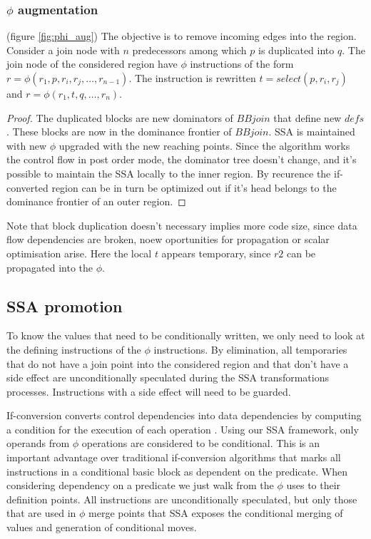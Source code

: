 \subsubsection{$\phi$ augmentation} (figure \ref{fig:phi_aug})
The objective is to remove incoming edges into the region. 
Consider a join node with $n$ predecessors among which $p$ is duplicated into $q$.  The join node of the considered region have $\phi$ instructions of the form $r=\phi(r_1,p,r_i,r_j,\dots,r_{n-1})$. The instruction is rewritten $t=select(p,r_i,r_j)$ and \mbox{$r=\phi(r_1,t,q,\dots,r_n)$}. 
\begin{proof}The duplicated blocks are new dominators of $BBjoin$ that define new $defs$. These blocks are now in the dominance frontier of $BBjoin$. SSA is maintained with new $\phi$ upgraded with the new reaching points.
Since the algorithm works the control flow in post order mode, the dominator tree doesn't change, and it's possible to maintain the SSA locally to the inner region. By recurence the if-converted region can be in turn be optimized out if it's head belongs to the dominance frontier of an outer region.
\end{proof}
Note that block duplication doesn't necessary implies more code size, since data flow dependencies are broken, noew oportunities for propagation or scalar optimisation arise. Here the local $t$ appears temporary, since $r2$ can be propagated into the $\phi$.

\subsection{SSA promotion}

To know the values that need to be conditionally written, we only need to look at the defining instructions of the $\phi$ instructions. By elimination, all temporaries that do not have a join point into the considered region and that don't have a side effect are unconditionally speculated during the SSA transformations processes. Instructions with a side effect will need to be guarded.

If-conversion converts control dependencies into data dependencies by computing a condition for the execution of each operation \cite{Schlansker-predicated}. Using our SSA framework, only operands from $\phi$ operations are considered to be conditional. This is an important advantage over traditional if-conversion algorithms that marks all instructions in a conditional basic block as dependent on the predicate. When considering dependency on a predicate we just walk from the $\phi$ uses to their definition points. All instructions are unconditionally speculated, but only those that are used in $\phi$ merge points that SSA exposes the conditional merging of values and generation of conditional moves.

